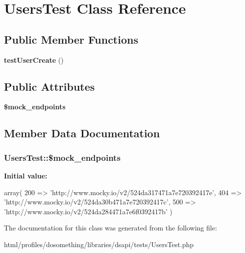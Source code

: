 \hypertarget{classUsersTest}{
\section{UsersTest Class Reference}
\label{classUsersTest}
}
\subsection*{Public Member Functions}
\begin{DoxyCompactItemize}
\item 
\hypertarget{classUsersTest_ad3c1b870a495657d5509a53ed85f7b7c}{
{\bfseries testUserCreate} ()}
\label{classUsersTest_ad3c1b870a495657d5509a53ed85f7b7c}

\end{DoxyCompactItemize}
\subsection*{Public Attributes}
\begin{DoxyCompactItemize}
\item 
{\bfseries \$mock\_\-endpoints}
\end{DoxyCompactItemize}


\subsection{Member Data Documentation}
\hypertarget{classUsersTest_a3f6a3af91f0fcb9c7c41d4072ba7c9f0}{
\subsubsection[{\$mock\_\-endpoints}]{\setlength{\rightskip}{0pt plus 5cm}UsersTest::\$mock\_\-endpoints}}
\label{classUsersTest_a3f6a3af91f0fcb9c7c41d4072ba7c9f0}
{\bfseries Initial value:}
\begin{DoxyCode}
 array(
        200 => 'http://www.mocky.io/v2/524da317471a7e720392417e',
        404 => 'http://www.mocky.io/v2/524da30b471a7e720392417c',
        500 => 'http://www.mocky.io/v2/524da284471a7e6f0392417b'
    )
\end{DoxyCode}


The documentation for this class was generated from the following file:\begin{DoxyCompactItemize}
\item 
html/profiles/dosomething/libraries/dsapi/tests/UsersTest.php\end{DoxyCompactItemize}
